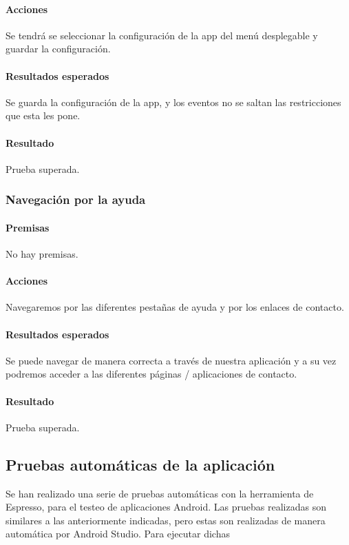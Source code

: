 \paragraph{Acciones}
Se tendrá se seleccionar la configuración de la app del menú desplegable y guardar la configuración.

\paragraph{Resultados esperados}
Se guarda la configuración de la app, y los eventos no se saltan las restricciones que esta les pone.

\paragraph{Resultado}
Prueba superada.

\subsubsection{Navegación por la ayuda}

\paragraph{Premisas}
No hay premisas.

\paragraph{Acciones}
Navegaremos por las diferentes pestañas de ayuda y por los enlaces de contacto.

\paragraph{Resultados esperados}
Se puede navegar de manera correcta a través de nuestra aplicación y a su vez podremos acceder a las diferentes páginas / aplicaciones de contacto.

\paragraph{Resultado}
Prueba superada.

\subsection{Pruebas automáticas de la aplicación}
Se han realizado una serie de pruebas automáticas con la herramienta de Espresso, para el testeo de aplicaciones Android. Las pruebas realizadas son similares a las anteriormente indicadas, pero estas son realizadas de manera automática por Android Studio. Para ejecutar dichas 